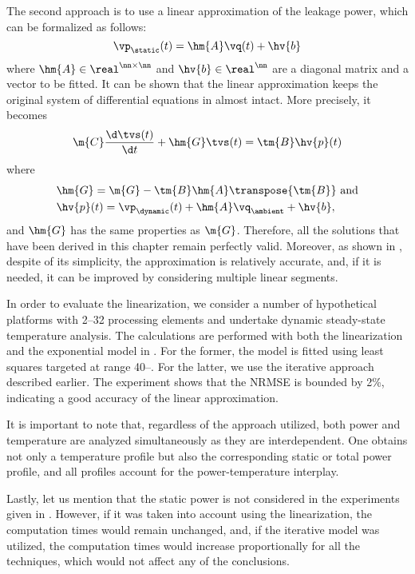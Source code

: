 The second approach is to use a linear approximation of the leakage power, which
can be formalized as follows:
\[
  \vp_\static(t) = \hm{A} \vq(t) + \hv{b}
\]
where $\hm{A} \in \real^{\nn \times \nn}$ and $\hv{b} \in \real^\nn$ are a
diagonal matrix and a vector to be fitted. It can be shown that the linear
approximation keeps the original system of differential equations in
 almost intact. More precisely, it
becomes
\[
  \m{C} \frac{\d \tvs(t)}{\d t} + \hm{G} \tvs(t) = \tm{B} \hv{p}(t)
\]
where
\begin{align*}
  & \hm{G} = \m{G} - \tm{B} \hm{A} \transpose{\tm{B}} \text{ and} \\
  & \hv{p}(t) = \vp_\dynamic(t) + \hm{A} \vq_\ambient + \hv{b},
\end{align*}
and $\hm{G}$ has the same properties as $\m{G}$. Therefore, all the solutions
that have been derived in this chapter remain perfectly valid. Moreover, as
shown in \cite{liu2007}, despite of its simplicity, the approximation is
relatively accurate, and, if it is needed, it can be improved by considering
multiple linear segments.

In order to evaluate the linearization, we consider a number of hypothetical
platforms with 2--32 processing elements and undertake dynamic steady-state
temperature analysis. The calculations are performed with both the linearization
and the exponential model in . For the former, the model is
fitted using least squares \cite{press2007} targeted at range 40--.
For the latter, we use the iterative approach described earlier. The experiment
shows that the \ac{NRMSE} is bounded by 2\%, indicating a good accuracy of the
linear approximation.

It is important to note that, regardless of the approach utilized, both power
and temperature are analyzed simultaneously as they are interdependent. One
obtains not only a temperature profile but also the corresponding static or
total power profile, and all profiles account for the power-temperature
interplay.

Lastly, let us mention that the static power is not considered in the
experiments given in . However, if it was
taken into account using the linearization, the computation times would remain
unchanged, and, if the iterative model was utilized, the computation times would
increase proportionally for all the techniques, which would not affect any of
the conclusions.
